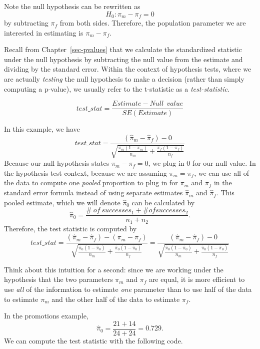 \documentclass[
  letterpaper,
  DIV=11,
  numbers=noendperiod]{scrreprt}
\theoremstyle{definition}
\theoremstyle{remark}
\begin{document}
Note the null hypothesis can be rewritten as \[H_0: \pi_m - \pi_f = 0\]
by subtracting \(\pi_f\) from both sides. Therefore, the population
parameter we are interested in estimating is \(\pi_m - \pi_f\).

Recall from Chapter~\ref{sec-pvalues} that we calculate the standardized
statistic under the null hypothesis by subtracting the null value from
the estimate and dividing by the standard error. Within the context of
hypothesis tests, where we are actually \emph{testing} the null
hypothesis to make a decision (rather than simply computing a p-value),
we usually refer to the t-statistic as a \emph{test-statistic}.

\[test\_stat = \frac{Estimate - Null \ \ value}{SE(Estimate)}\]

In this example, we have
\[test\_stat = \frac{(\hat{\pi}_m - \hat{\pi}_f) - 0}{\sqrt{\frac{\pi_m(1-\pi_m)}{n_m} + \frac{\pi_f(1-\pi_f)}{n_f}}}\]
Because our null hypothesis states \(\pi_m - \pi_f = 0\), we plug in 0
for our null value. In the hypothesis test context, because we are
assuming \(\pi_m = \pi_f\), we can use all of the data to compute one
\emph{pooled} proportion to plug in for \(\pi_m\) and \(\pi_f\) in the
standard error formula instead of using separate estimates
\(\hat{\pi}_m\) and \(\hat{\pi}_f\). This pooled estimate, which we will
denote \(\hat{\pi}_0\) can be calculated by
\[\hat{\pi}_0 = \frac{\# \ of \ successes_1 + \# of successes_2}{n_1 + n_2}.\]
Therefore, the test statistic is computed by
\[test\_stat = \frac{(\hat{\pi}_m - \hat{\pi}_f) - (\pi_m - \pi_f)}{\sqrt{\frac{\hat{\pi}_0(1-\hat{\pi}_0)}{n_m} + \frac{\hat{\pi}_0(1-\hat{\pi}_0)}{n_f}}}=\frac{(\hat{\pi}_m - \hat{\pi}_f) - 0}{\sqrt{\frac{\hat{\pi}_0(1-\hat{\pi}_0)}{n_m} + \frac{\hat{\pi}_0(1-\hat{\pi}_0)}{n_f}}}\]

Think about this intuition for a second: since we are working under the
hypothesis that the two parameters \(\pi_m\) and \(\pi_f\) are equal, it
is more efficient to use \emph{all} of the information to estimate
\emph{one} parameter than to use half of the data to estimate \(\pi_m\)
and the other half of the data to estimate \(\pi_f\).

In the promotions example,
\[\hat{\pi}_0 = \frac{21 + 14}{24 + 24} = 0.729.\] We can compute the
test statistic with the following code.
\end{document}
